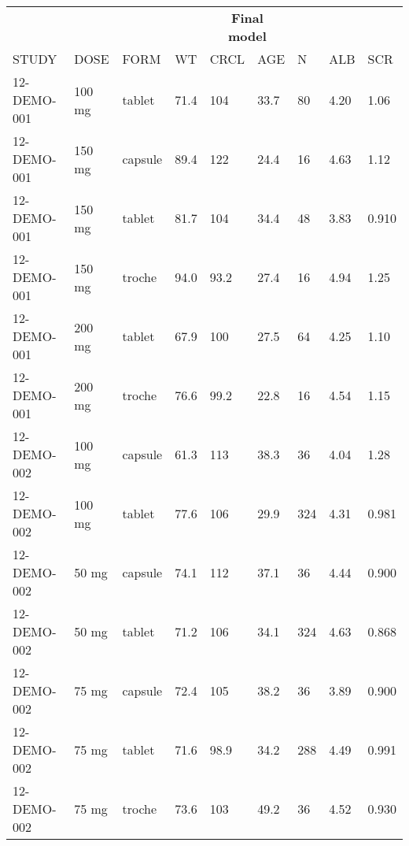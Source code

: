{\def\arraystretch{1.4}\tabcolsep=5pt
\begin{threeparttable}
\begin{tabular}[h]{lllllllll}
\hline
\multicolumn{4}{c}{} & \multicolumn{2}{c}{\textbf{Final model}} & \multicolumn{3}{c}{}\\
\cmidrule(lr){5-6}
STUDY & DOSE & FORM & WT & CRCL & AGE & N & ALB & SCR \\
\hline
12-DEMO-001 & 100 mg & tablet & 71.4 & 104 & 33.7 & 80 & 4.20 & 1.06 \\
12-DEMO-001 & 150 mg & capsule & 89.4 & 122 & 24.4 & 16 & 4.63 & 1.12 \\
12-DEMO-001 & 150 mg & tablet & 81.7 & 104 & 34.4 & 48 & 3.83 & 0.910 \\
12-DEMO-001 & 150 mg & troche & 94.0 & 93.2 & 27.4 & 16 & 4.94 & 1.25 \\
12-DEMO-001 & 200 mg & tablet & 67.9 & 100 & 27.5 & 64 & 4.25 & 1.10 \\
12-DEMO-001 & 200 mg & troche & 76.6 & 99.2 & 22.8 & 16 & 4.54 & 1.15 \\
12-DEMO-002 & 100 mg & capsule & 61.3 & 113 & 38.3 & 36 & 4.04 & 1.28 \\
12-DEMO-002 & 100 mg & tablet & 77.6 & 106 & 29.9 & 324 & 4.31 & 0.981 \\
12-DEMO-002 & 50 mg & capsule & 74.1 & 112 & 37.1 & 36 & 4.44 & 0.900 \\
12-DEMO-002 & 50 mg & tablet & 71.2 & 106 & 34.1 & 324 & 4.63 & 0.868 \\
12-DEMO-002 & 75 mg & capsule & 72.4 & 105 & 38.2 & 36 & 3.89 & 0.900 \\
12-DEMO-002 & 75 mg & tablet & 71.6 & 98.9 & 34.2 & 288 & 4.49 & 0.991 \\
12-DEMO-002 & 75 mg & troche & 73.6 & 103 & 49.2 & 36 & 4.52 & 0.930 \\
\hline
\end{tabular}
\end{threeparttable}
}
